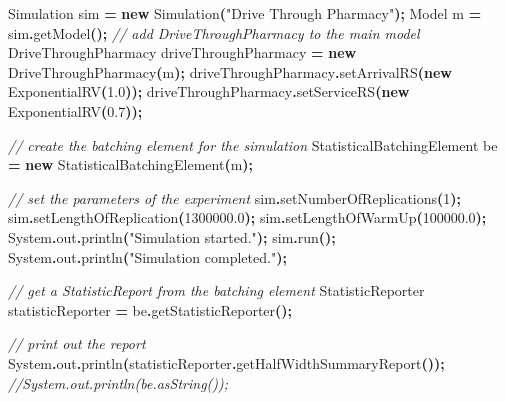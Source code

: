 \documentclass[
]{book}
\newenvironment{Shaded}{\begin{snugshade}}{\end{snugshade}}
\newcommand{\BuiltInTok}[1]{#1}
\newcommand{\CommentTok}[1]{\textcolor[rgb]{0.56,0.35,0.01}{\textit{#1}}}
\newcommand{\DecValTok}[1]{\textcolor[rgb]{0.00,0.00,0.81}{#1}}
\newcommand{\FloatTok}[1]{\textcolor[rgb]{0.00,0.00,0.81}{#1}}
\newcommand{\FunctionTok}[1]{\textcolor[rgb]{0.00,0.00,0.00}{#1}}
\newcommand{\KeywordTok}[1]{\textcolor[rgb]{0.13,0.29,0.53}{\textbf{#1}}}
\newcommand{\NormalTok}[1]{#1}
\newcommand{\OperatorTok}[1]{\textcolor[rgb]{0.81,0.36,0.00}{\textbf{#1}}}
\newcommand{\StringTok}[1]{\textcolor[rgb]{0.31,0.60,0.02}{#1}}
\theoremstyle{definition}
\theoremstyle{definition}
\theoremstyle{definition}
\theoremstyle{definition}
\theoremstyle{remark}
\begin{document}
\begin{Shaded}
\begin{Highlighting}[]
\NormalTok{Simulation sim }\OperatorTok{=} \KeywordTok{new} \FunctionTok{Simulation}\OperatorTok{(}\StringTok{"Drive Through Pharmacy"}\OperatorTok{);}
\NormalTok{Model m }\OperatorTok{=}\NormalTok{ sim}\OperatorTok{.}\FunctionTok{getModel}\OperatorTok{();}
\CommentTok{// add DriveThroughPharmacy to the main model}
\NormalTok{DriveThroughPharmacy driveThroughPharmacy }\OperatorTok{=} \KeywordTok{new} \FunctionTok{DriveThroughPharmacy}\OperatorTok{(}\NormalTok{m}\OperatorTok{);}
\NormalTok{driveThroughPharmacy}\OperatorTok{.}\FunctionTok{setArrivalRS}\OperatorTok{(}\KeywordTok{new} \FunctionTok{ExponentialRV}\OperatorTok{(}\FloatTok{1.0}\OperatorTok{));}
\NormalTok{driveThroughPharmacy}\OperatorTok{.}\FunctionTok{setServiceRS}\OperatorTok{(}\KeywordTok{new} \FunctionTok{ExponentialRV}\OperatorTok{(}\FloatTok{0.7}\OperatorTok{));}

\CommentTok{// create the batching element for the simulation}
\NormalTok{StatisticalBatchingElement be }\OperatorTok{=} \KeywordTok{new} \FunctionTok{StatisticalBatchingElement}\OperatorTok{(}\NormalTok{m}\OperatorTok{);}

\CommentTok{// set the parameters of the experiment}
\NormalTok{sim}\OperatorTok{.}\FunctionTok{setNumberOfReplications}\OperatorTok{(}\DecValTok{1}\OperatorTok{);}
\NormalTok{sim}\OperatorTok{.}\FunctionTok{setLengthOfReplication}\OperatorTok{(}\FloatTok{1300000.0}\OperatorTok{);}
\NormalTok{sim}\OperatorTok{.}\FunctionTok{setLengthOfWarmUp}\OperatorTok{(}\FloatTok{100000.0}\OperatorTok{);}
\BuiltInTok{System}\OperatorTok{.}\FunctionTok{out}\OperatorTok{.}\FunctionTok{println}\OperatorTok{(}\StringTok{"Simulation started."}\OperatorTok{);}
\NormalTok{sim}\OperatorTok{.}\FunctionTok{run}\OperatorTok{();}
\BuiltInTok{System}\OperatorTok{.}\FunctionTok{out}\OperatorTok{.}\FunctionTok{println}\OperatorTok{(}\StringTok{"Simulation completed."}\OperatorTok{);}

\CommentTok{// get a StatisticReport from the batching element}
\NormalTok{StatisticReporter statisticReporter }\OperatorTok{=}\NormalTok{ be}\OperatorTok{.}\FunctionTok{getStatisticReporter}\OperatorTok{();}

\CommentTok{// print out the report}
\BuiltInTok{System}\OperatorTok{.}\FunctionTok{out}\OperatorTok{.}\FunctionTok{println}\OperatorTok{(}\NormalTok{statisticReporter}\OperatorTok{.}\FunctionTok{getHalfWidthSummaryReport}\OperatorTok{());}
\CommentTok{//System.out.println(be.asString());}


\end{Highlighting}
\end{Shaded}
\end{document}
